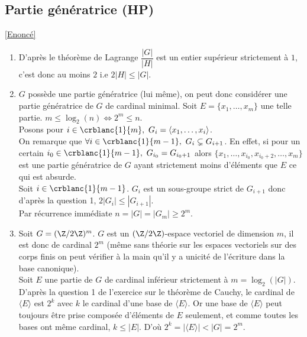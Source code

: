 \documentclass[8pt]{book}
\begin{document}
	\subsection{Partie génératrice  (HP)}
	\label{Partie génératrice corrigé}
	\textcolor{blue}{\hyperref[Partie génératrice]{[Enoncé]}}\\
	\begin{enumerate}[leftmargin=*]
		\item D'après le théorème de Lagrange $\dfrac{|G|}{|H|}$ est un entier supérieur strictement à $1$, c'est donc au moins $2$ i.e $2|H|\leq |G|$.
		\item $G$ possède une partie génératrice (lui même), on peut donc considérer une partie génératrice de $G$ de cardinal minimal. Soit $E=\{x_1,\dots,x_m\}$ une telle partie. $m\leq \log_2(n)\iff 2^m\leq n$.\\
		Posons pour $i\in \crblanc{1}{m},\ G_i=\langle x_1,\dots,x_i\rangle$.\\
		On remarque que $\forall i\in \crblanc{1}{m-1},\ G_i\subsetneq G_{i+1}$. En effet, si pour un certain $i_0\in \crblanc{1}{m-1},\ G_{i_0}=G_{i_0+1}$ alors $\{x_1,\dots,x_{i_0},x_{i_0+2},\dots,x_m\}$ est une partie génératrice de $G$ ayant strictement moins d'éléments que $E$ ce qui est absurde.\\
		Soit $i\in \crblanc{1}{m-1}$. $G_i$ est un sous-groupe strict de $G_{i+1}$ donc d'après la question 1, $2|G_i|\leq |G_{i+1}|$.\\
		Par récurrence immédiate $n=|G|=|G_m|\geq 2^m$.
		\item Soit $G=(\Z/2\Z)^m$. $G$ est un $(\Z/2\Z)$-espace vectoriel de dimension $m$, il est donc de cardinal $2^m$ (même sans théorie sur les espaces vectoriels sur des corps finis on peut vérifier à la main qu'il y a unicité de l'écriture dans la base canonique).\\
		Soit $E$ une partie de $G$ de cardinal inférieur strictement à $m=\log_2(|G|)$. D'après la question 1 de l'exercice sur le théorème de Cauchy, le cardinal de $\langle E\rangle$ est $2^k$ avec $k$ le cardinal d'une base de $\langle E\rangle$. Or une base de $\langle E\rangle$ peut toujours être prise composée d'éléments de $E$ seulement, et comme toutes les bases ont même cardinal, $k\leq |E|$. D'où $2^k=|\langle E\rangle|<|G|=2^m$.
	\end{enumerate}
	
\end{document}
